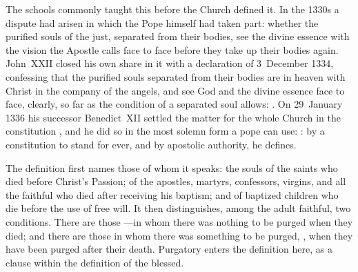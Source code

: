 The schools commonly taught this before the Church defined it. In the 1330s a dispute had arisen in which the Pope himself had taken part: whether the purified souls of the just, separated from their bodies, see the divine essence with the vision the Apostle calls face to face before they take up their bodies again. John~XXII closed his own share in it with a declaration of 3~December 1334, confessing that the purified souls separated from their bodies are in heaven with Christ in the company of the angels, and see God and the divine essence face to face, clearly, so far as the condition of a separated soul allows: . On 29~January 1336 his successor Benedict~XII settled the matter for the whole Church in the constitution , and he did so in the most solemn form a pope can use: : by a constitution to stand for ever, and by apostolic authority, he defines.

The definition first names those of whom it speaks: the souls of the saints who died before Christ's Passion; of the apostles, martyrs, confessors, virgins, and all the faithful who died after receiving his baptism; and of baptized children who die before the use of free will. It then distinguishes, among the adult faithful, two conditions. There are those ---in whom there was nothing to be purged when they died; and there are those in whom there was something to be purged, , when they have been purged after their death. Purgatory enters the definition here, as a clause within the definition of the blessed.

